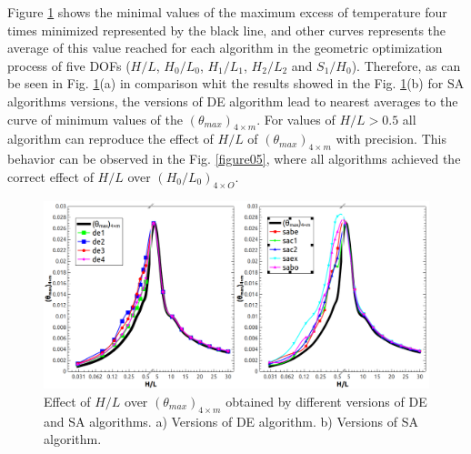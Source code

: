 \documentclass[12pt,fleqn]{article}
\begin{document}
Figure \ref{figure04} shows  the minimal values of the maximum excess of temperature four times minimized represented by the black line, and other curves represents the average of this value reached for each algorithm in the geometric optimization process of five DOFs ($H/L$, $H_{0}/L_{0}$, $H_{1}/L_{1}$, $H_{2}/L_{2}$ and $S_{1}/H_{0}$). Therefore, as can be seen in Fig. \ref{figure04}(a) in comparison whit the results showed in the Fig. \ref{figure04}(b) for SA algorithms versions, the versions of DE algorithm lead to nearest averages to the curve of minimum values of the $({\theta}_{max})_{4\times m}$. For values of $H/L > 0.5$ all algorithm can reproduce the effect of $H/L$ of $({\theta}_{max})_{4\times m}$ with precision. This behavior can be observed in the Fig. \ref{figure05}, where all algorithms achieved the correct effect of $H/L$ over ${(H_{0}/L_{0})_{4\times O}}$.
\begin{figure}[H]
\centering
\includegraphics[width=0.9\linewidth]{imgs/5dof/de_sa_hl_tmin.png}
\caption{ {\small Effect of $H/L$ over $({\theta}_{max})_{4\times m}$ obtained by different versions of DE and SA algorithms. a) Versions of DE algorithm. b) Versions of SA algorithm.}}
\label{figure04}
\end{figure}
 
\end{document}
